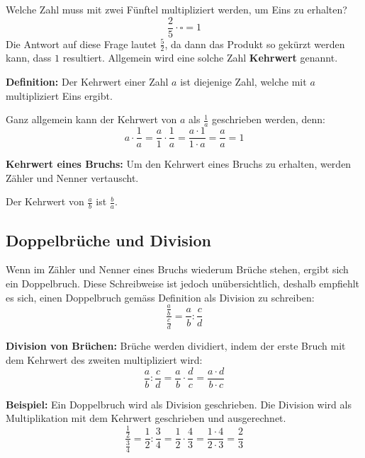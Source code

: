 Welche Zahl muss mit zwei Fünftel multipliziert werden, um Eins zu erhalten?
\[
  \frac{2}{5}\cdot\square = 1
\]
Die Antwort auf diese Frage lautet $\frac{5}{2}$, da dann das Produkt so gekürzt werden kann, dass $1$ resultiert. Allgemein wird eine solche Zahl \textbf{Kehrwert} genannt.

\textbf{Definition:} Der Kehrwert einer Zahl $a$ ist diejenige Zahl, welche mit $a$ multipliziert Eins ergibt.

Ganz allgemein kann der Kehrwert von $a$ als $\frac{1}{a}$ geschrieben werden, denn:
\[
  a\cdot \frac{1}{a} = \frac{a}{1}\cdot\frac{1}{a} = \frac{a\cdot 1}{1\cdot a} = \frac{a}{a} = 1
\]
\begin{theorem}
  \textbf{Kehrwert eines Bruchs:} Um den Kehrwert eines Bruchs zu erhalten, werden Zähler und Nenner vertauscht.

  Der Kehrwert von $\displaystyle\frac{a}{b}$ ist $\displaystyle\frac{b}{a}$.
\end{theorem}

\subsection{Doppelbrüche und Division}

Wenn im Zähler und Nenner eines Bruchs wiederum Brüche stehen, ergibt sich ein Doppelbruch. Diese Schreibweise ist jedoch unübersichtlich, deshalb empfiehlt es sich, einen Doppelbruch gemäss Definition als Division zu schreiben:
\[
  \frac{\frac{a}{b}}{\frac{c}{d}} = \frac{a}{b}:\frac{c}{d}
\]
\begin{theorem}
  \textbf{Division von Brüchen:} Brüche werden dividiert, indem der erste Bruch mit dem Kehrwert des zweiten multipliziert wird:
  \[
    \frac{a}{b}:\frac{c}{d} = \frac{a}{b}\cdot\frac{d}{c} = \frac{a\cdot d}{b\cdot c}
  \]
\end{theorem}
\begin{example}
  \textbf{Beispiel:} Ein Doppelbruch wird als Division geschrieben. Die Division wird als Multiplikation mit dem Kehrwert geschrieben und ausgerechnet.
  \[
    \frac{\frac{1}{2}}{\frac{3}{4}} = \frac{1}{2}:\frac{3}{4} = \frac{1}{2}\cdot\frac{4}{3} = \frac{1\cdot 4}{2\cdot 3} = \frac{2}{3}
  \]
\end{example}
